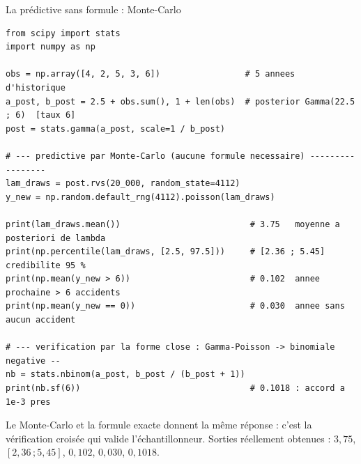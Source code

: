 \begin{frame}[fragile]{La prédictive sans formule : Monte-Carlo}
\begin{codebox}
\begin{lstlisting}
from scipy import stats
import numpy as np

obs = np.array([4, 2, 5, 3, 6])                 # 5 annees d'historique
a_post, b_post = 2.5 + obs.sum(), 1 + len(obs)  # posterior Gamma(22.5 ; 6)  [taux 6]
post = stats.gamma(a_post, scale=1 / b_post)

# --- predictive par Monte-Carlo (aucune formule necessaire) -----------------
lam_draws = post.rvs(20_000, random_state=4112)
y_new = np.random.default_rng(4112).poisson(lam_draws)

print(lam_draws.mean())                          # 3.75   moyenne a posteriori de lambda
print(np.percentile(lam_draws, [2.5, 97.5]))     # [2.36 ; 5.45]  credibilite 95 %
print(np.mean(y_new > 6))                        # 0.102  annee prochaine > 6 accidents
print(np.mean(y_new == 0))                       # 0.030  annee sans aucun accident

# --- verification par la forme close : Gamma-Poisson -> binomiale negative --
nb = stats.nbinom(a_post, b_post / (b_post + 1))
print(nb.sf(6))                                  # 0.1018 : accord a 1e-3 pres
\end{lstlisting}
\end{codebox}
\vspace{0mm}
\centering\footnotesize
Le Monte-Carlo et la formule exacte donnent la même réponse : c'est la
vérification croisée qui valide l'échantillonneur. Sorties réellement obtenues :
$3{,}75$, $[2{,}36\,;5{,}45]$, $0{,}102$, $0{,}030$, $0{,}1018$.
\end{frame}

